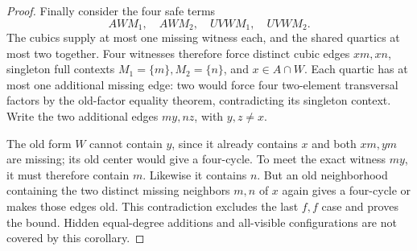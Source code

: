 \documentclass[11pt]{article}
\theoremstyle{definition}
\theoremstyle{remark}
\begin{document}
\begin{proof}
Finally consider the four safe terms
\[
 AWM_1,\quad AWM_2,\quad UVWM_1,\quad UVWM_2.
\]
The cubics supply at most one missing witness each, and the shared quartics at most two together. Four witnesses therefore force distinct cubic edges $xm,xn$, singleton full contexts $M_1=\{m\},M_2=\{n\}$, and $x\in A\cap W$. Each quartic has at most one additional missing edge: two would force four two-element transversal factors by the old-factor equality theorem, contradicting its singleton context. Write the two additional edges $my,nz$, with $y,z\ne x$.

The old form $W$ cannot contain $y$, since it already contains $x$ and both $xm,ym$ are missing; its old center would give a four-cycle. To meet the exact witness $my$, it must therefore contain $m$. Likewise it contains $n$. But an old neighborhood containing the two distinct missing neighbors $m,n$ of $x$ again gives a four-cycle or makes those edges old. This contradiction excludes the last $f,f$ case and proves the bound. Hidden equal-degree additions and all-visible configurations are not covered by this corollary.
\end{proof}
\end{document}
